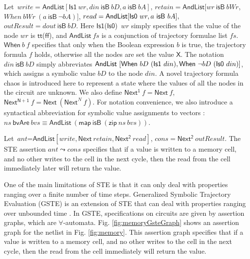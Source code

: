 \documentclass[final]{IEEEtran}
\begin{document}


 Let\  $write=\mathsf{AndList}[\mathsf{Is1}\ wr,din\ \mathsf{isB}\
 bD,a\ \mathsf{isB}\ bA]$, $retain=\mathsf{AndList}[wr\ \mathsf{isB}\
 bWr$, $When\ bWr\ (a\
 \mathsf{isB}\ \lnot bA)]$, $read=\mathsf{AndList}[\mathsf{%
 Is0}\ wr,a\ \mathsf{isB}\ bA],$ $outResult=dout\ \mathsf{isB}\ bD$.
 Here $\mathsf{Is1}$($\mathsf{Is0}$)\ $wr$ simply specifies that the
 value of the node $wr$ is $\mathsf{tt}$($\mathsf{ff}$), and
 $\mathsf{AndList}\ fs$ is a conjunction of trajectory formulae list
 $fs$. $\mathsf{When}\ b \ f$ specifies that only when the Boolean
 expression $b$ is true, the trajectory formula $f$ holds, otherwise
 all the nodes are set the value $\mathsf{X}$.
 The notation $din\ \mathsf{isB}\ bD$ simply abbreviates $ \mathsf{%
 AndList\ [When\ }bD\ (\mathsf{Is1}\ din),\mathsf{When\ \lnot }bD\ (\mathsf{Is0}%
 \ din)]$, which assigns a symbolic value $bD$ to the node $din$. A
 novel trajectory formula \textsf{chaos} is introduced here to
 represent a state where the values of all the nodes in the circuit
 are unknown. We also define $\mathsf{Next^1}\ f=\mathsf{Next}\ f$,
 $\mathsf{Next^{N+1}}\ f=\mathsf{Next}\ (\mathsf{Next}^{N}\ f)$.
For notation convenience, we also introduce a syntactical
abbreviation for symbolic value assignments to vectors :
$ns\mathsf{\ bvAre\ }bvs\equiv \mathsf{AndList}\ (\mathsf{map}\
\mathsf{isB}\ (\mathsf{zip}\ ns\ bvs))$.

 Let\  $ant$=$\mathsf{AndList}[write, \mathsf{Next}\ retain,
 \mathsf{Next^2}\ read]$, $cons=\mathsf{Next^2}\ outResult$. The STE
 assertion $ant\leadsto cons$ specifies that if a value is written to
 a memory cell, and no other writes to the cell in the next cycle,
 then the read from the cell immediately  later will return the value.

 One of the main  limitations of STE is that it can only deal with
 properties ranging over a finite number of time steps. Generalized
 Symbolic Trajectory Evaluation (GSTE) is an extension of STE that
 can deal with properties ranging over unbounded time
 \cite{YangS03,yangTech,DBLP:conf/iccad/YangG02}.
 In GSTE, specifications on circuits are given by assertion graphs, which are $%
 \forall$-automata. Fig. \ref{fig:memoryGsteGraph} shows an
 assertion graph for the netlist in Fig. \ref{fig:memory}. This
 assertion graph  specifies that if a value is written to a memory
 cell, and no other writes to the cell in the next cycle, then the
 read from the cell immediately will return the value.
\end{document}
